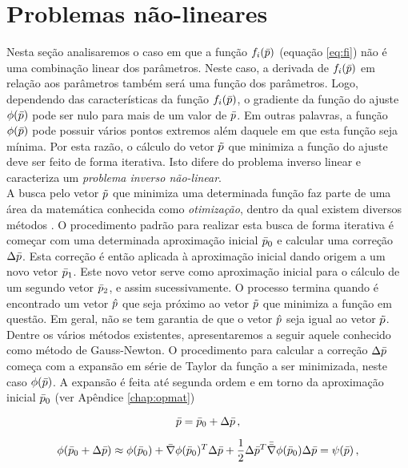 \section{Problemas não-lineares}
\label{sec:nao-linear}

Nesta seção analisaremos o caso em que a função $f_i(\bar{p})$
(equação \ref{eq:fi}) não é uma combinação linear dos parâmetros.
Neste caso, a derivada de $f_i(\bar{p})$ em relação aos parâmetros também será
uma função dos parâmetros.
Logo, dependendo das características da função $f_i(\bar{p})$, o gradiente da
função do ajuste $\phi(\bar{p})$ pode ser nulo para mais de um valor de
$\bar{p}$.
Em outras palavras, a função $\phi(\bar{p})$ pode possuir
vários pontos extremos além daquele em que esta função seja mínima.
Por esta razão, o cálculo do vetor $\tilde{p}$ que minimiza a função do ajuste deve
ser feito de forma iterativa.
Isto difere do problema inverso linear e caracteriza um {\it problema inverso
não-linear}.
\\
\indent A busca pelo vetor $\tilde{p}$ que minimiza uma determinada função faz
parte de uma área da matemática conhecida como {\it otimização}, dentro da qual
existem diversos métodos \citep{kelley}.
O procedimento padrão para realizar esta busca de forma iterativa é começar com
uma determinada aproximação inicial $\bar{p}_0$ e calcular uma correção
$\Delta\bar{p}$.
Esta correção é então aplicada à aproximação inicial dando origem a um novo vetor
$\bar{p}_1$.
Este novo vetor serve como aproximação inicial para o cálculo de um segundo
vetor $\bar{p}_2$, e assim sucessivamente.
O processo termina quando é encontrado um vetor $\hat{p}$ que seja próximo ao
vetor $\tilde{p}$ que minimiza a função em questão.
Em geral, não se tem garantia de que o vetor $\hat{p}$ seja igual ao vetor
$\tilde{p}$.
\\
\indent Dentre os vários métodos existentes, apresentaremos a seguir aquele
conhecido como método de Gauss-Newton.
O procedimento para calcular a correção $\Delta\bar{p}$ começa com a
expansão em série de Taylor da função a ser minimizada, neste caso $\phi(\bar{p})$.
A expansão é feita até segunda ordem e em torno da aproximação inicial $\bar{p}_0$
(ver Apêndice \ref{chap:opmat})

\begin{equation}
\bar{p} =  \bar{p}_0 + \Delta\bar{p} \thinspace ,
\end{equation}

\begin{equation}
\phi(\bar{p}_0 + \Delta\bar{p}) \approx \phi(\bar{p}_0) +
    \bar{\nabla}\phi(\bar{p}_0)^T\Delta\bar{p} +
    \frac{1}{2}\Delta\bar{p}^T\bar{\bar{\nabla}}\phi(\bar{p}_0)\Delta\bar{p}
= \psi(\bar{p}) \thinspace ,
\label{eq:taylor}
\end{equation}

